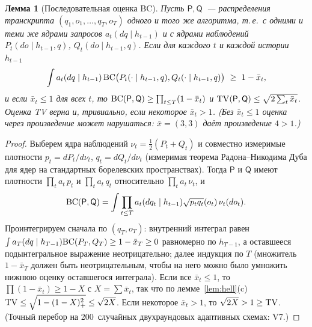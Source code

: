 \documentclass[11pt,a4paper]{article}
\numberwithin{equation}{section}
\newtheorem{lemma}[theorem]{Лемма}
\theoremstyle{definition}
\theoremstyle{remark}
\begin{document}
\begin{lemma}[Последовательная оценка BC]\label{lem:seq}
Пусть $\mathsf P,\mathsf Q$~--- распределения транскрипта $(q_1,o_1,\dots,q_T,o_T)$ одного и того же алгоритма, т.\,е.\ с одними и теми же ядрами запросов $a_t(dq\mid h_{t-1})$ и с ядрами наблюдений $P_t(do\mid h_{t-1},q)$, $Q_t(do\mid h_{t-1},q)$. Если для каждого $t$ и каждой истории $h_{t-1}$
\[
\int a_t(dq\mid h_{t-1})\,\mathrm{BC}\big(P_t(\cdot\mid h_{t-1},q),Q_t(\cdot\mid h_{t-1},q)\big)\ \ge\ 1-\bar x_t,
\]
и если $\bar x_t\le1$ для всех $t$, то $\mathrm{BC}(\mathsf P,\mathsf Q)\ge\prod_{t\le T}(1-\bar x_t)$ и $\mathrm{TV}(\mathsf P,\mathsf Q)\le\sqrt{2\sum_t\bar x_t}$. Оценка TV верна и, тривиально, если некоторое $\bar x_t>1$. (Без $\bar x_t\le1$ оценка через произведение может нарушаться: $\bar x=(3,3)$ даёт произведение $4>1$.)
\end{lemma}
\begin{proof}
Выберем ядра наблюдений $\nu_t=\frac12(P_t+Q_t)$ и совместно измеримые плотности $p_t=dP_t/d\nu_t$, $q_t=dQ_t/d\nu_t$ (измеримая теорема Радона--Никодима Дуба для ядер на стандартных борелевских пространствах). Тогда $\mathsf P$ и $\mathsf Q$ имеют плотности $\prod_ta_t\,p_t$ и $\prod_ta_t\,q_t$ относительно $\prod_ta_t\,\nu_t$, и
\[\mathrm{BC}(\mathsf P,\mathsf Q)=\int\prod_{t\le T}a_t(dq_t\mid h_{t-1})\sqrt{p_tq_t}(o_t)\,\nu_t(do_t).\]
Проинтегрируем сначала по $(q_T,o_T)$: внутренний интеграл равен $\int a_T(dq\mid h_{T-1})\mathrm{BC}(P_T,Q_T)\ge1-\bar x_T\ge0$ равномерно по $h_{T-1}$, а оставшееся подынтегральное выражение неотрицательно; далее индукция по $T$ (множитель $1-\bar x_T$ должен быть неотрицательным, чтобы на него можно было умножить нижнюю оценку оставшегося интеграла). Если все $\bar x_t\le1$, то $\prod(1-\bar x_t)\ge1-X$ с $X=\sum\bar x_t$, так что по лемме~\ref{lem:hell}(c) $\mathrm{TV}\le\sqrt{1-(1-X)_+^2}\le\sqrt{2X}$. Если некоторое $\bar x_t>1$, то $\sqrt{2X}>1\ge\mathrm{TV}$. (Точный перебор на 200~случайных двухраундовых адаптивных схемах: V7.)
\end{proof}
\end{document}
